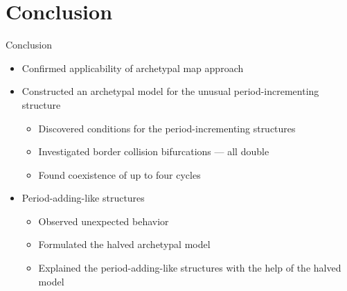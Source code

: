 \section{Conclusion}


\begin{frame}{Conclusion}
	\begin{itemize}
        \item Confirmed applicability of archetypal map approach
            \pause
        \item Constructed an archetypal model for the unusual period-incrementing structure
            \begin{itemize}
                \item Discovered conditions for the period-incrementing structures
                \item Investigated border collision bifurcations --- all double
                \item Found coexistence of up to four cycles
            \end{itemize}
            \pause
        \item Period-adding-like structures
            \begin{itemize}
                \item Observed unexpected behavior
                \item Formulated the halved archetypal model
                \item Explained the period-adding-like structures with the help of the halved model
            \end{itemize}
	\end{itemize}
\end{frame}
